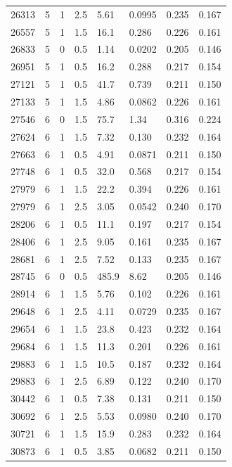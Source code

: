 \documentclass[preview]{standalone}
\begin{document}
{{{\begin{tabular}{L{1.2cm}C{1.2cm} C{0.3cm}C{0.5cm} C{1.4cm}C{1.4cm} C{1.4cm}C{1.4cm}}
  26313  &     5  & 1     & 2.5 &  5.61  & 0.0995  & 0.235 &  0.167   \\ 
  26557  &     5  & 1     & 1.5 &  16.1  & 0.286  & 0.226 &  0.161   \\ 
  26833  &     5  & 0     & 0.5 &  1.14  & 0.0202  & 0.205 &  0.146   \\ 
  26951  &     5  & 1     & 0.5 &  16.2  & 0.288  & 0.217 &  0.154   \\ 
  27121  &     5  & 1     & 0.5 &  41.7  & 0.739  & 0.211 &  0.150   \\ 
  27133  &     5  & 1     & 1.5 &  4.86  & 0.0862  & 0.226 &  0.161   \\ 
  27546  &     6  & 0     & 1.5 &  75.7  & 1.34  & 0.316 &  0.224   \\ 
  27624  &     6  & 1     & 1.5 &  7.32  & 0.130  & 0.232 &  0.164   \\ 
  27663  &     6  & 1     & 0.5 &  4.91  & 0.0871  & 0.211 &  0.150   \\ 
  27748  &     6  & 1     & 0.5 &  32.0  & 0.568  & 0.217 &  0.154   \\ 
  27979  &     6  & 1     & 1.5 &  22.2  & 0.394  & 0.226 &  0.161   \\ 
  27979  &     6  & 1     & 2.5 &  3.05  & 0.0542  & 0.240 &  0.170   \\ 
  28206  &     6  & 1     & 0.5 &  11.1  & 0.197  & 0.217 &  0.154   \\ 
  28406  &     6  & 1     & 2.5 &  9.05  & 0.161  & 0.235 &  0.167   \\ 
  28681  &     6  & 1     & 2.5 &  7.52  & 0.133  & 0.235 &  0.167   \\ 
  28745  &     6  & 0     & 0.5 &  485.9  & 8.62  & 0.205 &  0.146   \\ 
  28914  &     6  & 1     & 1.5 &  5.76  & 0.102  & 0.226 &  0.161   \\ 
  29648  &     6  & 1     & 2.5 &  4.11  & 0.0729  & 0.235 &  0.167   \\ 
  29654  &     6  & 1     & 1.5 &  23.8  & 0.423  & 0.232 &  0.164   \\ 
  29684  &     6  & 1     & 1.5 &  11.3  & 0.201  & 0.226 &  0.161   \\ 
  29883  &     6  & 1     & 1.5 &  10.5  & 0.187  & 0.232 &  0.164   \\ 
  29883  &     6  & 1     & 2.5 &  6.89  & 0.122  & 0.240 &  0.170   \\ 
  30442  &     6  & 1     & 0.5 &  7.38  & 0.131  & 0.211 &  0.150   \\ 
  30692  &     6  & 1     & 2.5 &  5.53  & 0.0980  & 0.240 &  0.170   \\ 
  30721  &     6  & 1     & 1.5 &  15.9  & 0.283  & 0.232 &  0.164   \\ 
  30873  &     6  & 1     & 0.5 &  3.85  & 0.0682  & 0.211 &  0.150   \\ 
\hline 
\end{tabular} 

}}}
\end{document}
